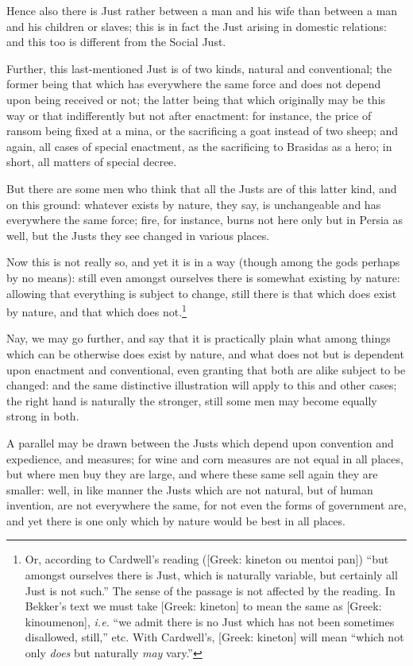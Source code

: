Hence also there is Just rather between a man and his wife than between a man
and his children or slaves; this is in fact the Just arising in domestic
relations: and this too is different from the Social Just.

Further, this last-mentioned Just is of two kinds, natural and conventional;
the former being that which has everywhere the same force and does not depend
upon being received or not; the latter being that which originally may be this
way or that indifferently but not after enactment: for instance, the price of
ransom being fixed at a mina, or the sacrificing a goat instead of two sheep;
and again, all cases of special enactment, as the sacrificing to Brasidas as a
hero; in short, all matters of special decree.

But there are some men who think that all the Justs are of this latter kind,
and on this ground: whatever exists by nature, they say, is unchangeable and
has everywhere the same force; fire, for instance, burns not here only but in
Persia as well, but the Justs they see changed in various places.

Now this is not really so, and yet it is in a way (though among the gods
perhaps by no means): still even amongst ourselves there is somewhat existing
by nature: allowing that everything is subject to change, still there is that
which does exist by nature, and that which does not.\footnote{Or, according to Cardwell’s reading ([Greek: kineton ou mentoi pan])
“but amongst ourselves there is Just, which is naturally variable, but
certainly all Just is not such.” The sense of the passage is not affected
by the reading. In Bekker’s text we must take [Greek: kineton] to mean
the same as [Greek: kinoumenon], \emph{i.e.} “we admit there is no Just
which has not been sometimes disallowed, still,” etc. With
Cardwell’s, [Greek: kineton] will mean “which not only \emph{does}
but naturally \emph{may} vary.”}

Nay, we may go further, and say that it is practically plain what among things
which can be otherwise does exist by nature, and what does not but is dependent
upon enactment and conventional, even granting that both are alike subject to
be changed: and the same distinctive illustration will apply to this and other
cases; the right hand is naturally the stronger, still some men may become
equally strong in both.

A parallel may be drawn between the Justs which depend upon convention and
expedience, and measures; for wine and corn measures are not equal in all
places, but where men buy they are large, and where these same sell again they
are smaller: well, in like manner the Justs which are not natural, but of human
invention, are not everywhere the same, for not even the forms of government
are, and yet there is one only which by nature would be best in all places.

